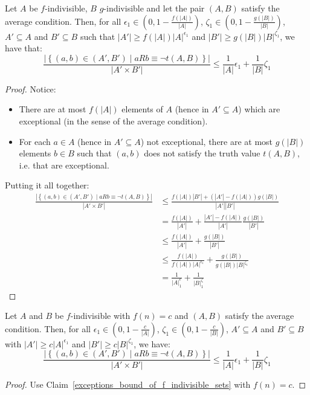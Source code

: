     \label{exceptions_bound_of_f_indivisible_sets}
        Let $A$ be $f$-indivisible, $B$ $g$-indivisible and let the pair $(A,B)$ satisfy the average condition.
        Then, for all $\epsilon_1 \in \left( 0, 1-\frac{f(|A|)}{|A|} \right)$, $\zeta_1 \in \left( 0, 1-\frac{g(|B|)}{|B|} \right)$, $A' \subseteq A$
            and $B' \subseteq B$ such that $|A'| \geq f(|A|) |A|^{\epsilon_1}$ and $|B'| \geq g(|B|) |B|^{\zeta_1}$,
            we have that:
        \[
            \frac{|\left\{ (a,b) \in (A',B') \mid a R b \equiv \neg t(A,B) \right\}|}{|A' \times B'|} \leq
                \frac{1}{|A|}\epsilon_1 + \frac{1}{|B|}\zeta_1
        \]
        \begin{proof}
            Notice:
            \begin{itemize}
                \item There are at most $f(|A|)$ elements of $A$ (hence in $A' \subseteq A$) which are exceptional
                    (in the sense of the average condition).
                \item For each $a \in A$ (hence in $A' \subseteq A$) not exceptional, there are at most $g(|B|)$ elements
                    $b \in B$ such that $(a,b)$ does not satisfy the truth value $t(A,B)$, i.e. that are exceptional.
            \end{itemize}
            Putting it all together:
            \[
                \begin{split}
                    \frac{|\left\{ (a,b) \in (A',B') \mid a R b \equiv \neg t(A,B) \right\}|}{|A' \times B'|}
                        &\leq \frac{f(|A|) |B'| + (|A'| - f(|A|)) g(|B|)}{|A'| |B'|} \\
                        &= \frac{f(|A|)}{|A'|} + \frac{|A'| - f(|A|)}{|A'|} \frac{g(|B|)}{|B'|} \\
                        &\leq \frac{f(|A|)}{|A'|} + \frac{g(|B|)}{|B'|} \\
                        &\leq \frac{f(|A|)}{f(|A|) |A|^{\epsilon_1}} + \frac{g(|B|)}{g(|B|) |B|^{\zeta_1}} \\
                        &= \frac{1}{|A|^\epsilon_1} + \frac{1}{|B|^\zeta_1}
                \end{split}
            \]
        \end{proof}

    \corollary[Corollary 4.9]
        Let $A$ and $B$ be $f$-indivisible with $f(n) = c$ and $(A,B)$ satisfy the average condition.
        Then, for all $\epsilon_1 \in (0, 1 - \frac{c}{|A|})$, $\zeta_1 \in (0, 1 - \frac{c}{|B|})$, $A' \subseteq A$ and
            $B' \subseteq B$ with $|A'| \geq c |A|^{\epsilon_1}$ and $|B'| \geq c |B|^{\zeta_1}$, we have:
        \[
            \frac{|\left\{ (a,b) \in (A',B') \mid a R b \equiv \neg t(A,B) \right\}|}{|A' \times B'|} \leq
                \frac{1}{|A|}\epsilon_1 + \frac{1}{|B|}\zeta_1
        \]
        \begin{proof}
            Use Claim~\ref{exceptions_bound_of_f_indivisible_sets} with $f(n) = c$.
        \end{proof}

